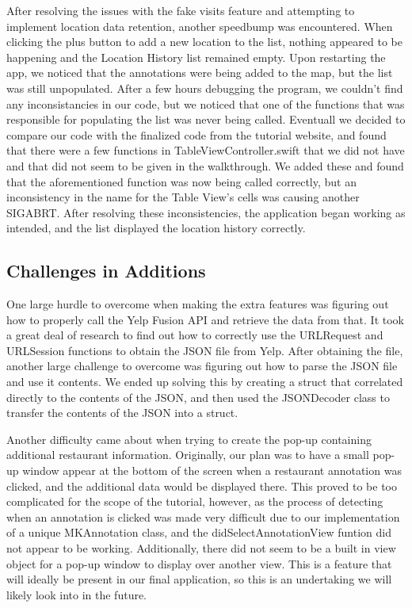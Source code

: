 \documentclass[conference]{IEEEtran}
\begin{document}
After resolving the issues with the fake visits feature and attempting to implement
location data retention, another speedbump was encountered. When clicking the plus
button to add a new location to the list, nothing appeared to be happening and the 
Location History list remained empty. Upon restarting the app, we noticed that the
annotations were being added to the map, but the list was still unpopulated. After a
few hours debugging the program, we couldn't find any inconsistancies in our code, but
we noticed that one of the functions that was responsible for populating the list was
never being called. Eventuall we decided to compare our code with the finalized code
from the tutorial website, and found that there were a few functions in 
TableViewController.swift that we did not have and that did not seem to be given in 
the walkthrough. We added these and found that the aforementioned function was now
being called correctly, but an inconsistency in the name for the Table View's cells
was causing another SIGABRT. After resolving these inconsistencies, the application
began working as intended, and the list displayed the location history correctly.

\subsection{Challenges in Additions}
One large hurdle to overcome when making the extra features was figuring out how
to properly call the Yelp Fusion API and retrieve the data from that. It took a 
great deal of research to find out how to correctly use the URLRequest and URLSession
functions to obtain the JSON file from Yelp. After obtaining the file, another large
challenge to overcome was figuring out how to parse the JSON file and use it contents.
We ended up solving this by creating a struct that correlated directly to the contents
of the JSON, and then used the JSONDecoder class to transfer the contents of the 
JSON into a struct.

Another difficulty came about when trying to create the pop-up containing additional
restaurant information. Originally, our plan was to have a small pop-up window appear
at the bottom of the screen when a restaurant annotation was clicked, and the 
additional data would be displayed there. This proved to be too complicated for the
scope of the tutorial, however, as the process of detecting when an annotation is 
clicked was made very difficult due to our implementation of a unique MKAnnotation
class, and the didSelectAnnotationView funtion did not appear to be working. 
Additionally, there did not seem to be a built in view object for a pop-up window
to display over another view. This is a feature that will ideally be present in our 
final application, so this is an undertaking we will likely look into in the future.
\end{document}
